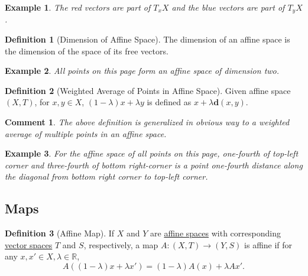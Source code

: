 \documentclass[letterpaper,12pt]{article}
\theoremstyle{plain}
\theoremstyle{plain}
\newtheorem{exmp}{Example}
\newtheorem*{cmnt*}{Comment}
\theoremstyle{definition}
\newtheorem{defn}{Definition}
\begin{document}
\begin{exmp}
The red vectors are part of $T_xX$ and the blue vectors are part of $T_yX$.
\begin{figure}[H]
\begin{center}
\begin{adjustbox}{max totalsize={.7\textwidth}{.4\textheight},center}
\end{adjustbox}
\end{center}
\end{figure}
\end{exmp}

\begin{defn}[Dimension of Affine Space]
The dimension of an affine space is the dimension of the space of its free vectors.
\end{defn}
\begin{exmp} All points on this page form an affine space of dimension two.
\end{exmp}

\begin{defn}[Weighted Average of Points in Affine Space]\label{defwaas}
Given affine space $(X,T)$, for $x,y\in X$, $(1-\lambda)x+\lambda y$ is defined as $x+\lambda\mathbf{d}(x,y)$.
\end{defn}
\begin{cmnt*}The above definition is generalized in obvious way to a weighted average of multiple points in an affine space.\end{cmnt*}
\begin{exmp} For the affine space of all points on this page, one-fourth of top-left corner and three-fourth of bottom right-corner is a point one-fourth distance along the diagonal from bottom right corner to top-left corner.
\end{exmp}

\subsection{Maps}
\begin{defn}[Affine Map]\label{defafmap}
If $X$ and $Y$ are \hyperref[defafsp]{affine spaces} with corresponding \hyperref[defrvs]{vector spaces} $T$ and $S$, respectively, a map $A:(X,T) \rightarrow (Y,S)$ is affine if for any $x,x'\in X,\lambda \in \mathbb{R}$,
$$A((1-\lambda)x+\lambda x') = (1-\lambda)A(x) + \lambda Ax'.$$
\end{defn}
\end{document}
